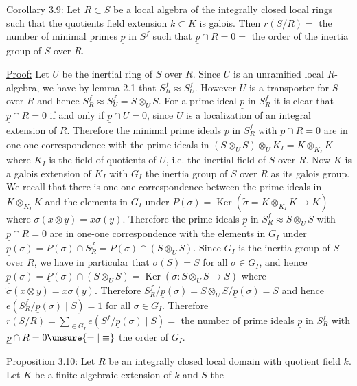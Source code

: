 Corollary 3.9: Let $R\subset S$ be a local algebra of the integrally closed local rings such that the quotients field extension $k\subset K$ is galois. Then $r(S/R)=$ the number of minimal primes $\underline p$ in $S^f$ such that $\underline p\cap R=0=$ the order of the inertia group of $S$ over $R$.

\uline{Proof:} Let $U$ be the inertial ring of $S$ over $R$. Since $U$ is an unramified local $R$-algebra, we have by lemma 2.1 that $S_R^f\approx S_U^f$. However $U$ is a transporter for $S$ over $R$ and hence $S_R^f\approx S_U^f=S\otimes_U S$. For a prime ideal $\underline p$ in $S_R^f$ it is clear that $\underline p\cap R=0$ if and only if $\underline p\cap U=0$, since $U$ is a localization of an integral extension of $R$. Therefore the minimal prime ideals $\underline p$ in $S_R^f$ with $\underline p\cap R=0$ are in one-one correspondence with the prime ideals in $(S\otimes_U S)\otimes_U K_I=K\otimes_{K_I}K$ where $K_I$ is the field of quotients of $U$, i.e. the inertial field of $S$ over $R$. Now $K$ is a galois extension of $K_I$ with $G_I$ the inertia group of $S$ over $R$ as its galois group. We recall that there is one-one correspondence between the prime ideals in $K\otimes_{K_I}K$ and the elements in $G_I$ under $\underline P(\sigma)=\operatorname{Ker}(\widetilde\sigma=K\otimes_{K_I}K\longrightarrow K)$ where $\widetilde\sigma(x\otimes y)=x\sigma(y)$. Therefore the prime ideals $\underline p$ in $S_R^f\approx S\otimes_U S$ with $\underline p\cap R=0$ are in one-one correspondence with the elements in $G_I$ under $\underline p(\sigma)=\underline P(\sigma)\cap S_R^f=\underline P(\sigma)\cap(S\otimes_U S)$. Since $G_I$ is the inertia group of $S$ over $R$, we have in particular that $\sigma(S)=S$ for all $\sigma\in G_I$, and hence $\underline p(\sigma)=\underline P(\sigma)\cap(S\otimes_U S)=\operatorname{Ker}(\widetilde\sigma:S\otimes_U S\longrightarrow S)$ where $\widetilde\sigma(x\otimes y)=x\sigma(y)$. Therefore $S_R^f/\underline p(\sigma)=S\otimes_U S/\underline p(\sigma)=S$ and hence $e(S_R^f/\underline p(\sigma)\mid S)=1$ for all $\sigma\in G_I$. Therefore $r(S/R)=\sum_{\in G_I}e(S^f/\underline p(\sigma)\mid S)=$ the number of prime ideals $\underline p$ in $S_R^f$ with $\underline p\cap R=0\unsure{=|\equiv}$ the order of $G_I$.

Proposition 3.10: Let $R$ be an integrally closed local domain with quotient field $k$. Let $K$ be a finite algebraic extension of $k$ and $S$ the
